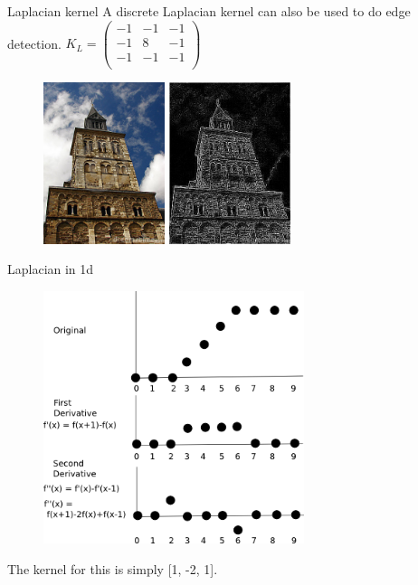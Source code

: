 \documentclass{beamer}
\begin{document}
\begin{frame}{Laplacian kernel}
A discrete Laplacian kernel can also be used to do edge detection. 
$K_L = \begin{pmatrix}
	-1 & -1 & -1\\
	-1 & 8 & -1\\
	-1 & -1 & -1\\
\end{pmatrix}$
\begin{figure}[ht]
\includegraphics[width=1.4in]{churchin.jpg}
\hspace{.1in}
\includegraphics[width=1.4in]{churchoutlaplace.jpg}
\hspace{.1in}
\end{figure}
\end{frame}

\begin{frame}{Laplacian in 1d}
\begin{figure}[ht]
\includegraphics[width=3in]{discreteLaplacian.png}
\end{figure}

The kernel for this is simply [1, -2, 1].
\end{frame}
\end{document}
